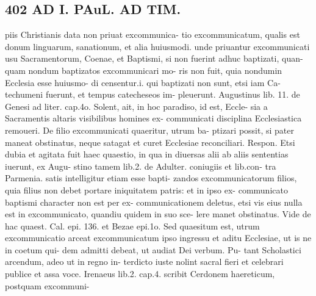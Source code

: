 \documentclass{article}
\begin{document}
\begin{pages}
\section*{402 AD I. PAuL. AD TIM. }piis Christianis data non priuat excommunica- tio excommunicatum, qualis est donum linguarum, sanationum, et alia huiusmodi. unde priuantur excommunicati usu Sacramentorum, Coenae, et Baptismi, si non fuerint adhuc baptizati, quan- quam nondum baptizatos excommunicari mo- ris non fuit, quia nondumin Ecclesia esse huiusmo- di censentur.i. qui baptizati non sunt, etsi iam Ca- techumeni fuerunt, et tempus catecheseos im- pleuerunt. Augustinus lib. 11. de Genesi ad liter. cap.4o. Solent, ait, in hoc paradiso, id est, Eccle- sia a Sacramentis altaris visibilibus homines ex- communicati disciplina Ecclesiastica remoueri. De filio excommunicati quaeritur, utrum ba- ptizari possit, si pater maneat obstinatus, neque satagat et curet Ecclesiae reconciliari. Respon. Etsi dubia et agitata fuit haec quaestio, in qua in diuersas alii ab aliis sententias iuerunt, ex Augu- stino tamem lib.2. de Adulter. coniugiis et lib.con- tra Parmenia. satis intelligitur etiam esse bapti- zandos excommunicatorum filios, quia filius non debet portare iniquitatem patris: et in ipso ex- communicato baptismi character non est per ex- communicationem deletus, etsi vis eius nulla est in excommunicato, quandiu quidem in suo sce- lere manet obstinatus. Vide de hac quaest. Cal. epi. 136. et Bezae epi.1o. Sed quaesitum est, utrum excommunicatio arceat excommunicatum ipso ingressu et aditu Ecclesiae, ut is ne in coetum qui- dem admitti debeat, ut audiat Dei verbum. Pu- tant Scholastici arcendum, adeo ut in regno in- terdicto iuste nolint sacral fieri et celebrari publice et assa voce. Irenaeus lib.2. cap.4. scribit Cerdonem haereticum, postquam excommuni- 

\end{pages}
\end{document}
